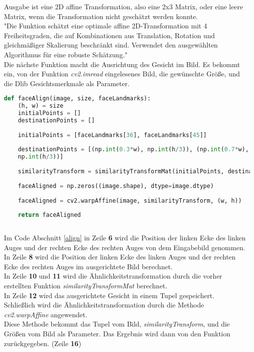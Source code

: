 	Ausgabe ist eine 2D affine Transformation, also eine 2x3 Matrix, oder eine leere
	Matrix, wenn die Transformation nicht geschätzt werden konnte.\\
	"Die Funktion schätzt eine optimale affine 2D-Transformation mit 4
	Freiheitsgraden, die auf Kombinationen aus Translation, Rotation und
	gleichmäßiger Skalierung beschränkt sind. Verwendet den ausgewählten Algorithmus
	für eine robuste Schätzung."\cite{opencv_library}
	\\
	
	Die nächste Funktion macht die Ausrichtung des Gesicht im Bild. 
	Es bekommt ein, von der Funktion \textit{cv2.imread} eingelesenes Bild, die
	gewünschte Größe, und die Dlib Gesichtsmerkmale als Parameter. 
	
	\begin{lstlisting}[caption=Gesichtsausrichtung,label=align,language=python]
	def faceAlign(image, size, faceLandmarks):
	(h, w) = size
	initialPoints = []
	destinationPoints = []
	
	initialPoints = [faceLandmarks[36], faceLandmarks[45]]
	
	destinationPoints = [(np.int(0.3*w), np.int(h/3)), (np.int(0.7*w),
	np.int(h/3))]
	
	similarityTransform = similarityTransformMat(initialPoints, destinationPoints)
	
	faceAligned = np.zeros((image.shape), dtype=image.dtype)
	
	faceAligned = cv2.warpAffine(image, similarityTransform, (w, h))
	
	return faceAligned
	
	\end{lstlisting}
	
	Im Code Abschnitt \ref{align} in Zeile \textbf{6} wird die Position der linken
	Ecke des linken Auges und der rechten Ecke des rechten Auges von dem Eingabebild
	genommen. \\
	In Zeile \textbf{8} wird die Position der linken Ecke des linken Auges und der
	rechten Ecke des rechten Auges im ausgerichtete Bild berechnet. \\
	In Zeile \textbf{10} und \textbf{11} wird die Ähnlichkeitstransformation durch
	die vorher erstellten Funktion \textit{similarityTransformMat} berechnet.\\
	In Zeile \textbf{12} wird das ausgerichtete Gesicht in einem Tupel gespeichert.
	\\
	Schließlich wird die Ähnlichkeitstransformation durch die Methode
	\textit{cv2.warpAffine} angewendet.\\
	Diese Methode bekommt das Tupel vom Bild, \textit{similarityTransform}, und die
	Größen vom Bild als Parameter. Das Ergebnis wird dann von den Funktion
	zurückgegeben. (Zeile \textbf{16}) 
	\\
	

